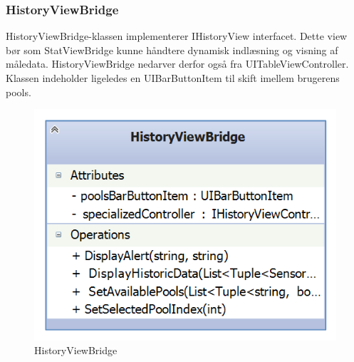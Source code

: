 \subsubsection{HistoryViewBridge}
HistoryViewBridge-klassen implementerer IHistoryView interfacet. Dette view bør som StatViewBridge kunne håndtere dynamisk indlæsning og visning af måledata. HistoryViewBridge nedarver derfor også fra UITableViewController. Klassen indeholder ligeledes en UIBarButtonItem til skift imellem brugerens pools.

\begin{figure}
	\centering
	\includegraphics[width=0.3\linewidth]{figs/design/ios_historyviewbridge}
	\caption{HistoryViewBridge}
	\label{fig:ios_historyviewbridge}
\end{figure}